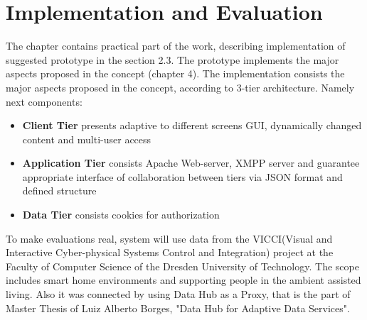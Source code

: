 \chapter{Implementation and Evaluation}
	The chapter contains practical part of the work, describing implementation of suggested prototype in the section
	2.3. The prototype implements the major aspects proposed in the concept (chapter 4).
	The implementation consists the major aspects proposed in the concept, according to 3-tier architecture. Namely next components:
	 \begin{itemize}
		\item \textbf{Client Tier} presents adaptive to different screens GUI, dynamically changed content and multi-user access
		\item \textbf{Application Tier} consists Apache Web-server, XMPP server and guarantee appropriate interface of collaboration between tiers via JSON format and defined structure
		\item \textbf{Data Tier} consists cookies for authorization
	\end{itemize}
	To make evaluations real, system will use data from the VICCI(Visual and Interactive Cyber-physical Systems Control and Integration) project at the Faculty of Computer Science of the Dresden University of Technology. The scope includes smart home environments and supporting people in the ambient assisted living. Also it was connected by using Data Hub as a Proxy, that is the part of Master Thesis of Luiz Alberto Borges, "Data Hub for Adaptive Data Services".

